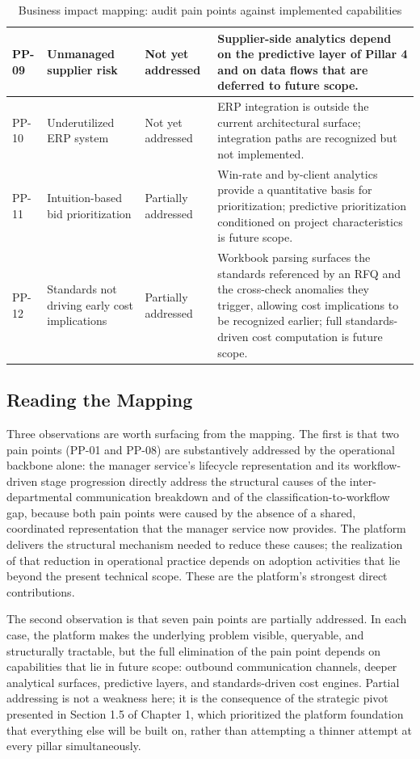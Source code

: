 \begin{table}[H]
\begin{tabular}{|p{0.8cm}|p{4.2cm}|p{2.2cm}|p{6cm}|}
PP-09 & Unmanaged supplier risk & Not yet addressed & Supplier-side analytics depend on the predictive layer of Pillar 4 and on data flows that are deferred to future scope. \\ \hline
PP-10 & Underutilized ERP system & Not yet addressed & ERP integration is outside the current architectural surface; integration paths are recognized but not implemented. \\ \hline
PP-11 & Intuition-based bid prioritization & Partially addressed & Win-rate and by-client analytics provide a quantitative basis for prioritization; predictive prioritization conditioned on project characteristics is future scope. \\ \hline
PP-12 & Standards not driving early cost implications & Partially addressed & Workbook parsing surfaces the standards referenced by an RFQ and the cross-check anomalies they trigger, allowing cost implications to be recognized earlier; full standards-driven cost computation is future scope. \\ \hline
\end{tabular}
\caption{Business impact mapping: audit pain points against implemented capabilities}
\label{tab:business_impact}
\end{table}

\subsection*{Reading the Mapping}
Three observations are worth surfacing from the mapping. The first is that two pain points (PP-01 and PP-08) are substantively addressed by the operational backbone alone: the manager service's lifecycle representation and its workflow-driven stage progression directly address the structural causes of the inter-departmental communication breakdown and of the classification-to-workflow gap, because both pain points were caused by the absence of a shared, coordinated representation that the manager service now provides. The platform delivers the structural mechanism needed to reduce these causes; the realization of that reduction in operational practice depends on adoption activities that lie beyond the present technical scope. These are the platform's strongest direct contributions.

The second observation is that seven pain points are partially addressed. In each case, the platform makes the underlying problem visible, queryable, and structurally tractable, but the full elimination of the pain point depends on capabilities that lie in future scope: outbound communication channels, deeper analytical surfaces, predictive layers, and standards-driven cost engines. Partial addressing is not a weakness here; it is the consequence of the strategic pivot presented in Section 1.5 of Chapter 1, which prioritized the platform foundation that everything else will be built on, rather than attempting a thinner attempt at every pillar simultaneously.

